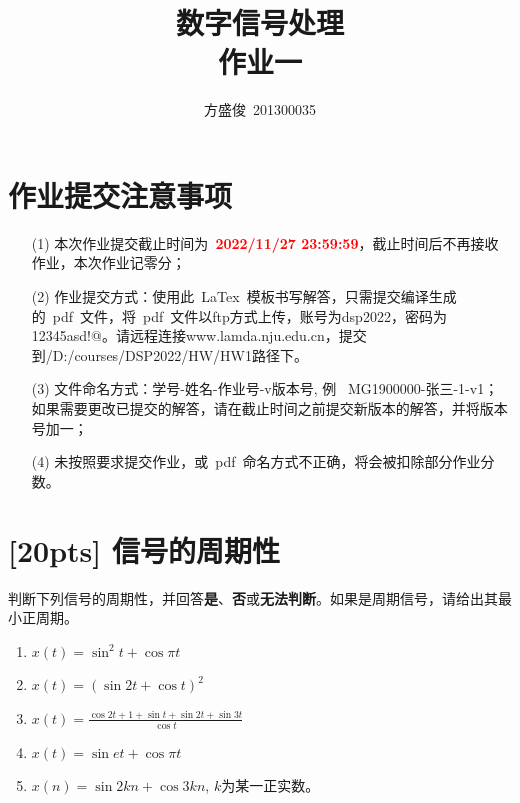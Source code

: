 \documentclass[a4paper,UTF8]{article}
\numberwithin{equation}{section}
\begin{document}
\title{数字信号处理\\
作业一}
\author{方盛俊\, 201300035} 
\maketitle

\section*{作业提交注意事项}
\begin{tcolorbox}
\begin{enumerate}
  \item[(1)] 本次作业提交截止时间为~\textcolor{red}{\textbf{2022/11/27  23:59:59}}，截止时间后不再接收作业，本次作业记零分；
  \item[(2)] 作业提交方式：使用此~LaTex~模板书写解答，只需提交编译生成的~pdf~文件，将~pdf~文件以ftp方式上传，账号为dsp2022，密码为12345asd!@。请远程连接www.lamda.nju.edu.cn，提交到/D:/courses/DSP2022/HW/HW1路径下。
  \item[(3)] 文件命名方式：学号-姓名-作业号-v版本号, 例~ MG1900000-张三-1-v1；如果需要更改已提交的解答，请在截止时间之前提交新版本的解答，并将版本号加一；
  \item[(4)] 未按照要求提交作业，或~pdf~命名方式不正确，将会被扣除部分作业分数。

\end{enumerate}
\end{tcolorbox}


\newpage
\section{[20pts] 信号的周期性}
判断下列信号的周期性，并回答\textbf{是}、\textbf{否}或\textbf{无法判断}。如果是周期信号，请给出其最小正周期。
\begin{enumerate}[(1)]
	\item $x(t)=\sin^2t+\cos\pi t$
	\item $x(t)=(\sin2t+\cos t)^2$
	\item $x(t)=\displaystyle\frac{\cos2t+1+\sin t+\sin2t+\sin3t}{\cos t}$
	\item $x(t)=\sin et+\cos\pi t$
	\item $x(n)=\sin 2kn+\cos 3kn$, $k$为某一正实数。
\end{enumerate}
\end{document}
